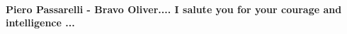  
 
 
 
 
\paragraph{Piero Passarelli - Bravo Oliver.... I salute you for your courage and intelligence ...}
\label{sec:31_12_2014.fb.stoun_oliver.kinorezhisser.usa.1.nightingale_in_ukraine.cmt.1.passarelli}

